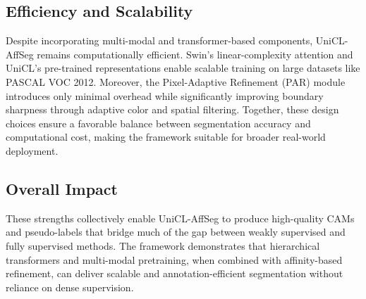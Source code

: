 \subsection{Efficiency and Scalability}
Despite incorporating multi-modal and transformer-based components, UniCL-AffSeg remains computationally efficient. Swin’s linear-complexity attention and UniCL’s pre-trained representations enable scalable training on large datasets like PASCAL VOC 2012. Moreover, the Pixel-Adaptive Refinement (PAR) module introduces only minimal overhead while significantly improving boundary sharpness through adaptive color and spatial filtering. Together, these design choices ensure a favorable balance between segmentation accuracy and computational cost, making the framework suitable for broader real-world deployment.

\subsection{Overall Impact}
These strengths collectively enable UniCL-AffSeg to produce high-quality CAMs and pseudo-labels that bridge much of the gap between weakly supervised and fully supervised methods. The framework demonstrates that hierarchical transformers and multi-modal pretraining, when combined with affinity-based refinement, can deliver scalable and annotation-efficient segmentation without reliance on dense supervision.

